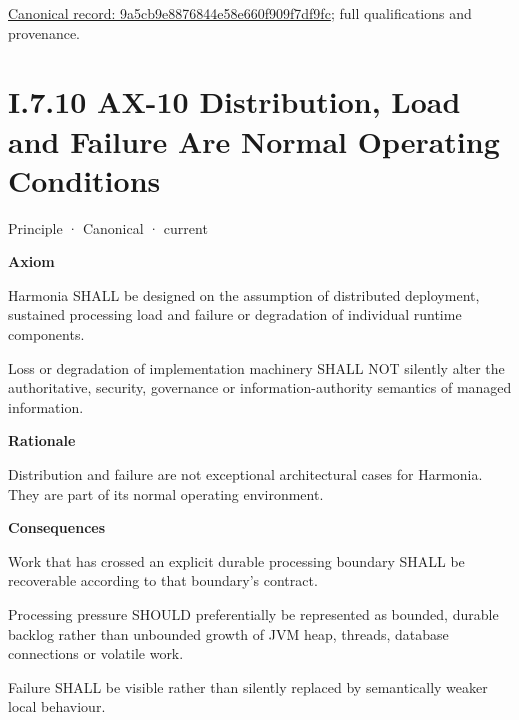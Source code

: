 {\footnotesize \href{../../../../continuum/motivation/principle/9a5cb9e8876844e58e660f909f7df9fc.md}{Canonical record: 9a5cb9e8876844e58e660f909f7df9fc}; full qualifications and provenance.}\par
\section*{I.7.10 AX-10 Distribution, Load and Failure Are Normal Operating Conditions}
\label{navigation:I.7.10}

\label{element:0d9673833eb840eab03804aa076c1b0c}
{\small Principle · Canonical · current}\par

\par\medskip\textbf{Axiom}\par


Harmonia SHALL be designed on the assumption of distributed deployment,
sustained processing load and failure or degradation of individual
runtime components.



Loss or degradation of implementation machinery SHALL NOT silently alter
the authoritative, security, governance or information-authority
semantics of managed information.



\par\medskip\textbf{Rationale}\par


Distribution and failure are not exceptional architectural cases for
Harmonia. They are part of its normal operating environment.



\par\medskip\textbf{Consequences}\par


Work that has crossed an explicit durable processing boundary SHALL be
recoverable according to that boundary's contract.



Processing pressure SHOULD preferentially be represented as bounded,
durable backlog rather than unbounded growth of JVM heap, threads,
database connections or volatile work.



Failure SHALL be visible rather than silently replaced by semantically
weaker local behaviour.



